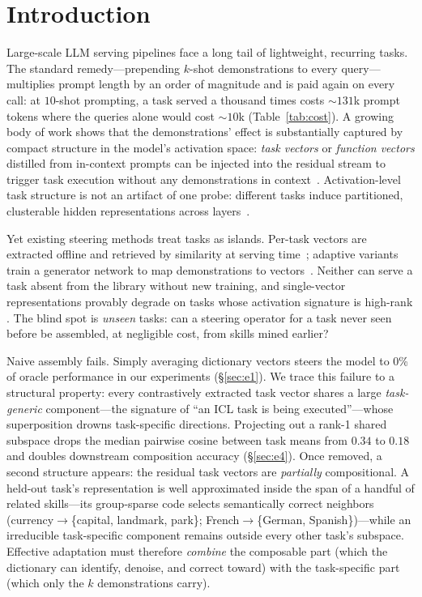 \documentclass[sigconf,review,anonymous]{acmart}
\begin{document}

\maketitle

\section{Introduction}
Large-scale LLM serving pipelines face a long tail of lightweight,
recurring tasks. The standard remedy---prepending $k$-shot demonstrations to
every query---multiplies prompt length by an order of magnitude and is paid
again on every call: at $10$-shot prompting, a task served a thousand times
costs ${\sim}131$k prompt tokens where the queries alone would cost
${\sim}10$k (Table~\ref{tab:cost}). A growing body of work shows that the
demonstrations' effect is substantially captured by compact structure in the
model's activation space: \emph{task vectors} or \emph{function vectors}
distilled from in-context prompts can be injected into the residual stream to
trigger task execution without any demonstrations in
context~\cite{hendel2023task,todd2024function}. Activation-level task
structure is not an artifact of one probe: different tasks induce partitioned,
clusterable hidden representations across layers~\cite{seap2025}.

Yet existing steering methods treat tasks as islands. Per-task vectors are
extracted offline and retrieved by similarity at serving
time~\cite{elicit2024}; adaptive variants train a generator network to map
demonstrations to vectors~\cite{atv2025}. Neither can serve a task absent
from the library without new training, and single-vector representations
provably degrade on tasks whose activation signature is high-rank
\cite{ranklimit2026}. The blind spot is \emph{unseen} tasks: can a steering
operator for a task never seen before be assembled, at negligible cost, from
skills mined earlier?

Naive assembly fails. Simply averaging dictionary vectors steers the model to
0\% of oracle performance in our experiments (\S\ref{sec:e1}). We trace this
failure to a structural property: every contrastively extracted task vector
shares a large \emph{task-generic} component---the signature of ``an ICL task
is being executed''---whose superposition drowns task-specific directions.
Projecting out a rank-1 shared subspace drops the median pairwise cosine
between task means from $0.34$ to $0.18$ and doubles downstream composition
accuracy (\S\ref{sec:e4}). Once removed, a second structure appears: the
residual task vectors are \emph{partially} compositional. A held-out task's
representation is well approximated inside the span of a handful of related
skills---its group-sparse code selects semantically correct neighbors
(currency$\to$\{capital, landmark, park\}; French$\to$\{German,
Spanish\})---while an irreducible task-specific component remains outside
every other task's subspace. Effective adaptation must therefore
\emph{combine} the composable part (which the dictionary can identify,
denoise, and correct toward) with the task-specific part (which only the $k$
demonstrations carry).
\end{document}
